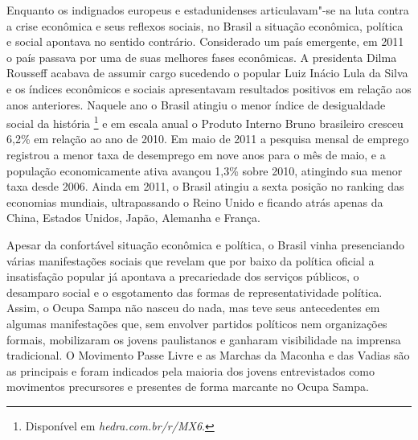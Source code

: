 Enquanto os indignados europeus e estadunidenses articulavam"-se na luta
contra a crise econômica e seus reflexos sociais, no Brasil a situação
econômica, política e social apontava no sentido contrário. Considerado
um país emergente, em 2011 o país passava por uma de suas melhores fases
econômicas. A presidenta Dilma Rousseff acabava de assumir cargo
sucedendo o popular Luiz Inácio Lula da Silva e os índices econômicos e
sociais apresentavam resultados positivos em relação aos anos
anteriores. Naquele ano o Brasil atingiu o menor índice de desigualdade
social da história \footnote{Disponível em \textit{hedra.com.br/r/MX6}.} e em escala anual o Produto Interno Bruno brasileiro cresceu 6,2\% em relação ao ano de 2010. 
Em maio de 2011 a pesquisa mensal de emprego registrou a menor taxa de
desemprego em nove anos para o mês de maio, e a população economicamente
ativa avançou 1,3\% sobre 2010, atingindo sua menor taxa desde 2006. 
Ainda em 2011, o Brasil atingiu a sexta posição no ranking das economias
mundiais, ultrapassando o Reino Unido e ficando atrás apenas da China,
Estados Unidos, Japão, Alemanha e França.

Apesar da confortável situação econômica e política, o Brasil vinha
presenciando várias manifestações sociais que revelam que por baixo da
política oficial a insatisfação popular já apontava a precariedade dos
serviços públicos, o desamparo social e o esgotamento das formas de
representatividade política. Assim, o Ocupa Sampa não nasceu do nada,
mas teve seus antecedentes em algumas manifestações que, sem envolver
partidos políticos nem organizações formais, mobilizaram os jovens
paulistanos e ganharam visibilidade na imprensa tradicional. O Movimento
Passe Livre e as Marchas da Maconha e das Vadias são as principais e
foram indicados pela maioria dos jovens entrevistados como movimentos
precursores e presentes de forma marcante no Ocupa Sampa.

